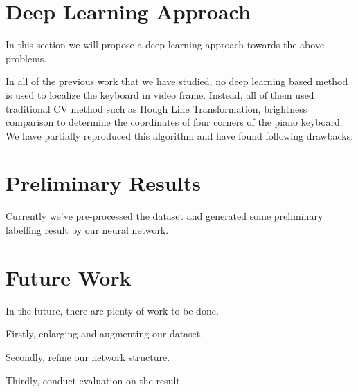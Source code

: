 \documentclass[10pt,twocolumn,letterpaper]{article}
\begin{document}
\section{Deep Learning Approach}
In this section we will propose a deep learning approach towards the above problems.

In all of the previous work that we have studied, no deep learning based method is used to localize the keyboard in video frame.
Instead, all of them used traditional CV method such as Hough Line Transformation, brightness comparison to determine the coordinates of four corners of the piano keyboard.
We have partially reproduced this algorithm and have found following drawbacks:

\section{Preliminary Results}
Currently we've pre-processed the dataset and generated some preliminary labelling result by our neural network.

\section{Future Work}
In the future, there are plenty of work to be done.

Firstly, enlarging and augmenting our dataset.

Secondly, refine our network structure.

Thirdly, conduct evaluation on the result.

{\small


}
\end{document}
